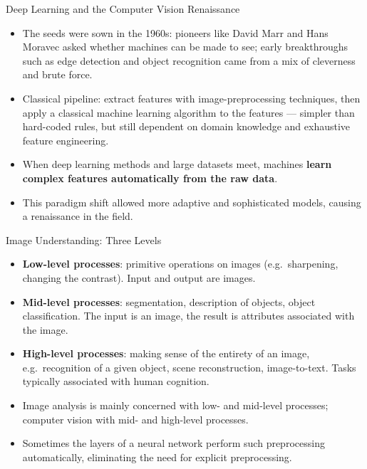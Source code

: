 \begin{frame}{Deep Learning and the Computer Vision Renaissance}
\begin{itemize}
  \item The seeds were sown in the 1960s: pioneers like David Marr and Hans Moravec asked whether machines can be made to see; early breakthroughs such as edge detection and object recognition came from a mix of cleverness and brute force.
  \item Classical pipeline: extract features with image-preprocessing techniques, then apply a classical machine learning algorithm to the features --- simpler than hard-coded rules, but still dependent on domain knowledge and exhaustive feature engineering.
  \item When deep learning methods and large datasets meet, machines \textbf{learn complex features automatically from the raw data}.
  \item This paradigm shift allowed more adaptive and sophisticated models, causing a renaissance in the field.
\end{itemize}
\end{frame}

\begin{frame}{Image Understanding: Three Levels}
\begin{itemize}
  \item \textbf{Low-level processes}: primitive operations on images (e.g.\ sharpening, changing the contrast). Input and output are images.
  \item \textbf{Mid-level processes}: segmentation, description of objects, object classification. The input is an image, the result is attributes associated with the image.
  \item \textbf{High-level processes}: making sense of the entirety of an image, e.g.\ recognition of a given object, scene reconstruction, image-to-text. Tasks typically associated with human cognition.
  \item Image analysis is mainly concerned with low- and mid-level processes; computer vision with mid- and high-level processes.
  \item Sometimes the layers of a neural network perform such preprocessing automatically, eliminating the need for explicit preprocessing.
\end{itemize}
\end{frame}

